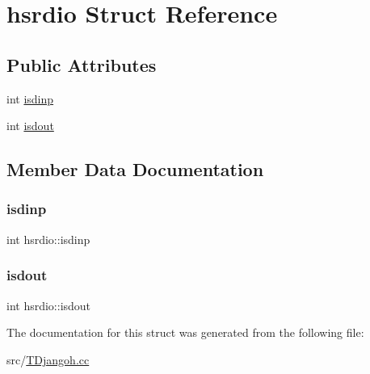 \hypertarget{structhsrdio}{}\section{hsrdio Struct Reference}
\label{structhsrdio}
\subsection*{Public Attributes}
\begin{DoxyCompactItemize}
\item 
int \hyperlink{structhsrdio_a5eb64bd845b09d1fbbce222cb0bac8b8}{isdinp}
\item 
int \hyperlink{structhsrdio_a00d629e340f83b5e267aadfdb962a4d6}{isdout}
\end{DoxyCompactItemize}


\subsection{Member Data Documentation}
\mbox{\label{structhsrdio_a5eb64bd845b09d1fbbce222cb0bac8b8}} 
\subsubsection{\texorpdfstring{isdinp}{isdinp}}
{\footnotesize\ttfamily int hsrdio\+::isdinp}

\mbox{\label{structhsrdio_a00d629e340f83b5e267aadfdb962a4d6}} 
\subsubsection{\texorpdfstring{isdout}{isdout}}
{\footnotesize\ttfamily int hsrdio\+::isdout}



The documentation for this struct was generated from the following file\+:\begin{DoxyCompactItemize}
\item 
src/\hyperlink{_t_djangoh_8cc}{T\+Djangoh.\+cc}\end{DoxyCompactItemize}
